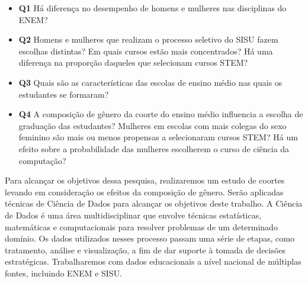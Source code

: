 \begin{itemize}
  \item \textbf{Q1} Há diferença no desempenho de homens e mulheres nas disciplinas do ENEM?
  \item \textbf{Q2} Homens e mulheres que realizam o processo seletivo do SISU fazem escolhas distintas? Em quais cursos estão mais concentrados? Há uma diferença na proporção daqueles que selecionam cursos STEM?
  \item \textbf{Q3} Quais são as características das escolas de ensino médio nas quais os estudantes se formaram?
  \item \textbf{Q4} A composição de gênero da coorte do ensino médio influencia a escolha de graduação das estudantes? Mulheres em escolas com mais colegas do sexo feminino são mais ou menos propensas a selecionaram cursos STEM? Há um efeito sobre a probabilidade das mulheres escolherem o curso de ciência da computação?
\end{itemize}

Para alcançar os objetivos dessa pesquisa, realizaremos um estudo de coortes levando em consideração os efeitos da composição de gênero. Serão aplicadas técnicas de Ciência de Dados para alcançar os objetivos deste trabalho. A Ciência de Dados é uma área multidisciplinar que envolve técnicas estatísticas, matemáticas e computacionais para resolver problemas de um determinado domínio. Os dados utilizados nesses processo passam uma série de etapas, como tratamento, análise e visualização, a fim de dar suporte à tomada de decisões estratégicas. Trabalharemos com dados educacionais a nível nacional de múltiplas fontes, incluindo ENEM e SISU.


